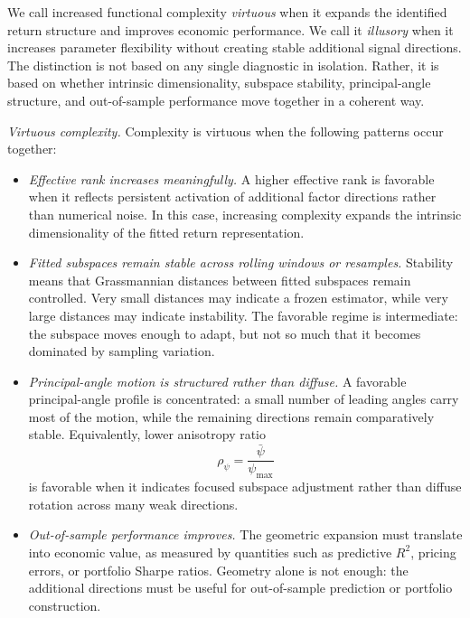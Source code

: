 \documentclass[11pt,letterpaper]{article}
\begin{document}
We call increased functional complexity \emph{virtuous} when it expands the identified return structure and improves economic performance. We call it \emph{illusory} when it increases parameter flexibility without creating stable additional signal directions. The distinction is not based on any single diagnostic in isolation. Rather, it is based on whether intrinsic dimensionality, subspace stability, principal-angle structure, and out-of-sample performance move together in a coherent way.

\smallskip\noindent
\textit{Virtuous complexity.}
Complexity is virtuous when the following patterns occur together:
\begin{itemize}
\item[(i)] \emph{Effective rank increases meaningfully.}
A higher effective rank is favorable when it reflects persistent activation of additional factor directions rather than numerical noise. In this case, increasing complexity expands the intrinsic dimensionality of the fitted return representation.

\item[(ii)] \emph{Fitted subspaces remain stable across rolling windows or resamples.}
Stability means that Grassmannian distances between fitted subspaces remain controlled. Very small distances may indicate a frozen estimator, while very large distances may indicate instability. The favorable regime is intermediate: the subspace moves enough to adapt, but not so much that it becomes dominated by sampling variation.

\item[(iii)] \emph{Principal-angle motion is structured rather than diffuse.}
A favorable principal-angle profile is concentrated: a small number of leading angles carry most of the motion, while the remaining directions remain comparatively stable. Equivalently, lower anisotropy ratio
\begin{equation*}
\rho_\psi=\frac{\bar\psi}{\psi_{\max}}
\end{equation*}
is favorable when it indicates focused subspace adjustment rather than diffuse rotation across many weak directions.

\item[(iv)] \emph{Out-of-sample performance improves.}
The geometric expansion must translate into economic value, as measured by quantities such as predictive $R^2$, pricing errors, or portfolio Sharpe ratios. Geometry alone is not enough: the additional directions must be useful for out-of-sample prediction or portfolio construction.
\end{itemize}
\end{document}
